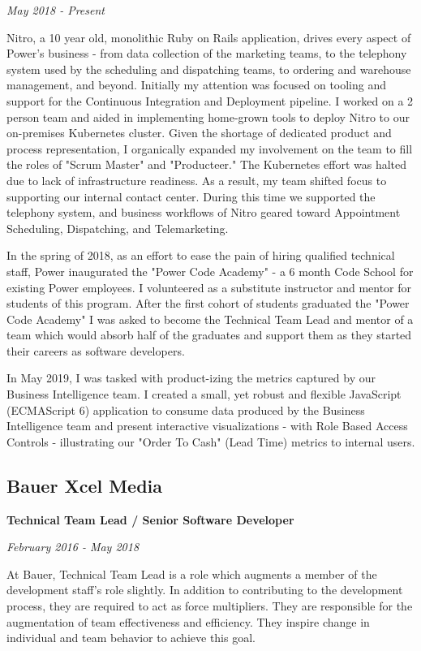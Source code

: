\documentclass[12pt letterpaper notitlepage]{article}
\begin{document}
\emph{May 2018 - Present}

Nitro, a 10 year old, monolithic Ruby on Rails application, drives every aspect of Power's business - from data collection of the marketing teams, to the telephony system used by the scheduling and dispatching teams, to ordering and warehouse management, and beyond. Initially my attention was focused on tooling and support for the Continuous Integration and Deployment pipeline. I worked on a 2 person team and aided in implementing home-grown tools to deploy Nitro to our on-premises Kubernetes cluster. Given the shortage of dedicated product and process representation, I organically expanded my involvement on the team to fill the roles of "Scrum Master" and "Producteer." The Kubernetes effort was halted due to lack of infrastructure readiness. As a result, my team shifted focus to supporting our internal contact center. During this time we supported the telephony system, and business workflows of Nitro geared toward Appointment Scheduling, Dispatching, and Telemarketing.

In the spring of 2018, as an effort to ease the pain of hiring qualified technical staff, Power inaugurated the "Power Code Academy" - a 6 month Code School for existing Power employees. I volunteered as a substitute instructor and mentor for students of this program. After the first cohort of students graduated the "Power Code Academy" I was asked to become the Technical Team Lead and mentor of a team which would absorb half of the graduates and support them as they started their careers as software developers.

In May 2019, I was tasked with product-izing the metrics captured by our Business Intelligence team. I created a small, yet robust and flexible JavaScript (ECMAScript 6) application to consume data produced by the Business Intelligence team and present interactive visualizations - with Role Based Access Controls - illustrating our "Order To Cash" (Lead Time) metrics to internal users.

\subsection*{Bauer Xcel Media}
\label{sec:orgabebb60}

\textbf{Technical Team Lead / Senior Software Developer}

\emph{February 2016 - May 2018}

At Bauer, Technical Team Lead is a role which augments a member of the development staff's role slightly. In addition to contributing to the development process, they are required to act as force multipliers. They are responsible for the augmentation of team effectiveness and efficiency. They inspire change in individual and team behavior to achieve this goal.
\end{document}
